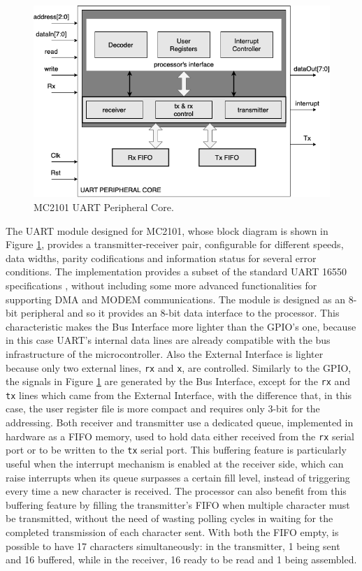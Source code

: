 \begin{figure}[h]
\vspace{0.5cm}
\includegraphics[scale=0.6]{./images/UART}
\caption{MC2101 UART Peripheral Core.}
\label{fig:uart} %
\end{figure}

The UART module designed for MC2101, whose block diagram is shown in Figure \ref{fig:uart}, provides a transmitter-receiver pair, configurable for different speeds, data widths, parity codifications and information status for several error conditions. The implementation provides a subset of the standard UART 16550 specifications \cite{uart16550}, without including some more advanced functionalities for supporting DMA and MODEM communications.
The module is designed as an 8-bit peripheral and so it provides an 8-bit data interface to the processor. This characteristic makes the Bus Interface more lighter than the GPIO's one, because in this case UART's internal data lines are already compatible with the bus infrastructure of the microcontroller. Also the External Interface is lighter because only two external lines, \texttt{rx} and \texttt{x}, are controlled. Similarly to the GPIO, the signals in Figure \ref{fig:uart} are generated by the Bus Interface, except for the \texttt{rx} and \texttt{tx} lines which came from the External Interface, with the difference that, in this case, the user register file is more compact and requires only 3-bit for the addressing. Both receiver and transmitter use a dedicated queue, implemented in hardware as a FIFO memory, used to hold data either received from the \texttt{rx} serial port or to be written to the \texttt{tx} serial port. This buffering feature is particularly useful when the interrupt mechanism is enabled at the receiver side, which can raise interrupts when its queue surpasses a certain fill level, instead of triggering every time a new character is received. The processor can also benefit from this buffering feature by filling the transmitter's FIFO when multiple character must be transmitted, without the need of wasting polling cycles in waiting for the completed transmission of each character sent. With both the FIFO empty, is possible to have 17 characters simultaneously: in the transmitter, 1 being sent and 16 buffered, while in the receiver, 16 ready to be read and 1 being assembled.

